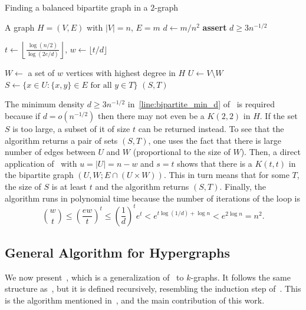 \begin{algorithm}[H]
    \caption{Finding a balanced bipartite graph in a $2$-graph}
    \label{alg:bipartite}
        \begin{algorithmic}[1]
        \Require A graph $H = (V, E)$ with $|V| = n$, $E = m$
        \State $d \gets m / n^2 $
        \State \textbf{assert} $d \geq 3 n^{-1/2}$ \label{line:bipartite_min_d}

        \State $t \gets \left\lfloor\frac{\log (n/2) }
        {\log (2e/d)}\right\rfloor,\, w \gets \lfloor t/d \rfloor$

        \State $W \gets $ a set of $w$ vertices with highest degree in $H$
        \State $U \gets V \setminus W$
         \label{line:2partite_for}
            \State $S \gets \{x \in U \colon \{x, y\} \in E \text{ for all } y \in T\}$
                \State \Return $(S, T)$
            \EndIf
        \EndFor
        \end{algorithmic}
\end{algorithm}

The minimum density $d \geq 3n^{-1/2}$ in~\cref{line:bipartite_min_d} of~ is required
because if $d = o\left(n^{-1/2}\right)$ then
there may not even be a $K(2, 2)$ in $H$.
If the set $S$ is too large, a subset of it of size $t$ can be returned instead.
To see that the algorithm returns a pair of sets $(S, T)$, one uses the fact that
there is large number of edges between $U$ and $W$ (proportional to the size of $W$).
Then, a direct application of~
with $u = |U| = n - w$ and $s = t$ shows that
there is a $K(t, t)$ in the bipartite graph $(U, W; E \cap (U \times W))$.
This in turn means that for some $T$,
the size of $S$ is at least $t$
and the algorithm returns $(S, T)$.
Finally, the algorithm runs in polynomial time because 
the  number of iterations of the loop is
\[
    \binom{w}{t} \leq
    \left(\frac{ew}{t}\right)^t \leq
    \left(\frac{1}{d}\right)^t e^t < e^{t \log (1/d) + \log n} <
    e^{2\log n} = n^2.
\]

\subsection{General Algorithm for Hypergraphs} \label{subsec:algorithm-for-k-graphs}

We now present~, which is
a generalization of~ to $k$-graphs.
It follows the same structure as~,
but it is defined recursively, resembling the induction step of~.
This is the algorithm mentioned in~,
and the main contribution of this work.

